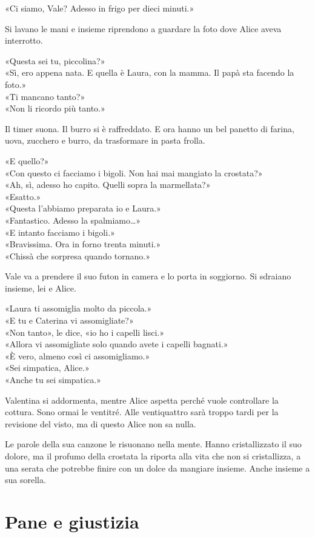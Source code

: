 \documentclass[10pt,oneside]{extbook}
\begin{document}
\par\medskip
«Ci siamo, Vale? Adesso in frigo per dieci minuti.»
\par\medskip
Si lavano le mani e insieme riprendono a guardare la foto dove Alice aveva interrotto.
\par\medskip
«Questa sei tu, piccolina?»\\
«Sì, ero appena nata. E quella \`e Laura, con la mamma. Il papà sta facendo la foto.»\\
«Ti mancano tanto?»\\
«Non li ricordo pi\`u tanto.»
\par\medskip
Il timer suona. Il burro si \`e raffreddato.  
E ora hanno un bel panetto di farina, uova, zucchero e burro,
 da trasformare in pasta frolla.
\par\medskip
«E quello?»\\
«Con questo ci facciamo i bigoli. Non hai mai mangiato la crostata?»\\
«Ah, sì, adesso ho capito. Quelli sopra la marmellata?»\\
«Esatto.»\\
«Questa l’abbiamo preparata io e Laura.»\\
«Fantastico. Adesso la spalmiamo…»\\
«E intanto facciamo i bigoli.»\\
«Bravissima. Ora in forno trenta minuti.»\\
«Chissà che sorpresa quando tornano.»
\par\medskip
Vale va a prendere il suo futon in camera e lo porta in soggiorno.  
Si sdraiano insieme, lei e Alice.
\par\medskip
«Laura ti assomiglia molto da piccola.»\\
«E tu e Caterina vi assomigliate?»\\
«Non tanto», le dice, «io ho i capelli lisci.»\\
«Allora vi assomigliate solo quando avete i capelli bagnati.»\\
«\`E vero, almeno cos\`i ci assomigliamo.»\\
«Sei simpatica, Alice.»\\
«Anche tu sei simpatica.»
\par\medskip
Valentina si addormenta, mentre Alice aspetta perch\'e vuole controllare la cottura.
Sono ormai le ventitré. Alle ventiquattro sarà troppo tardi per la revisione del visto,
ma di questo Alice non sa nulla.

Le parole della sua canzone le risuonano nella mente. Hanno cristallizzato il suo dolore,
ma il profumo della crostata la riporta alla vita che non si cristallizza,
a una serata che potrebbe finire con un dolce da mangiare insieme.
Anche insieme a sua sorella.
\clearpage{}
\clearpage{}\chapter{Pane e giustizia}
\end{document}
